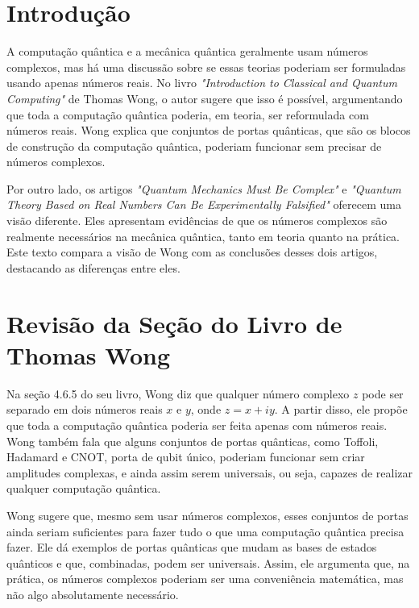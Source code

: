 \documentclass[article]{abntex2}
\begin{document}
\newpage

\Large\tableofcontents
\thispagestyle{plain}
\newpage


\large

\section{Introdução}
\thispagestyle{plain}

A computação quântica e a mecânica quântica geralmente usam números complexos, mas há uma discussão sobre se essas teorias poderiam ser formuladas usando apenas números reais. No livro \textit{"Introduction to Classical and Quantum Computing"} de Thomas Wong, o autor sugere que isso é possível, argumentando que toda a computação quântica poderia, em teoria, ser reformulada com números reais. Wong explica que conjuntos de portas quânticas, que são os blocos de construção da computação quântica, poderiam funcionar sem precisar de números complexos.

Por outro lado, os artigos \textit{"Quantum Mechanics Must Be Complex"} e \textit{"Quantum Theory Based on Real Numbers Can Be Experimentally Falsified"} oferecem uma visão diferente. Eles apresentam evidências de que os números complexos são realmente necessários na mecânica quântica, tanto em teoria quanto na prática. Este texto compara a visão de Wong com as conclusões desses dois artigos, destacando as diferenças entre eles.


\section{Revisão da Seção do Livro de Thomas Wong}
\thispagestyle{plain}

Na seção 4.6.5 do seu livro, Wong diz que qualquer número complexo \( z \) pode ser separado em dois números reais \( x \) e \( y \), onde \( z = x + iy \). A partir disso, ele propõe que toda a computação quântica poderia ser feita apenas com números reais. Wong também fala que alguns conjuntos de portas quânticas, como {Toffoli, Hadamard} e {CNOT, porta de qubit único}, poderiam funcionar sem criar amplitudes complexas, e ainda assim serem universais, ou seja, capazes de realizar qualquer computação quântica.

Wong sugere que, mesmo sem usar números complexos, esses conjuntos de portas ainda seriam suficientes para fazer tudo o que uma computação quântica precisa fazer. Ele dá exemplos de portas quânticas que mudam as bases de estados quânticos e que, combinadas, podem ser universais. Assim, ele argumenta que, na prática, os números complexos poderiam ser uma conveniência matemática, mas não algo absolutamente necessário. \cite{wong2022introduction}
\end{document}
